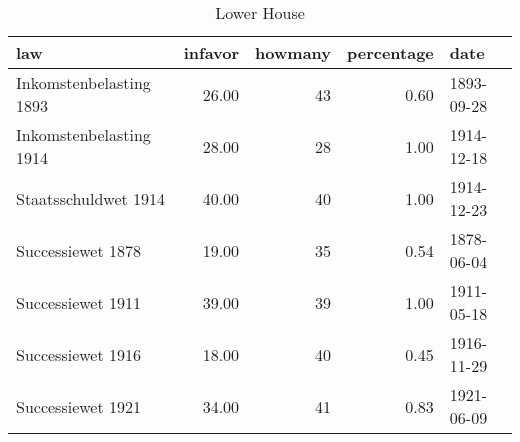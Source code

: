 \begin{table}[ht]
\centering
\begin{tabular}{lrrrl}
  \hline
law & infavor & howmany & percentage & date \\ 
  \hline
Inkomstenbelasting 1893 & 26.00 &  43 & 0.60 & 1893-09-28 \\ 
  Inkomstenbelasting 1914 & 28.00 &  28 & 1.00 & 1914-12-18 \\ 
  Staatsschuldwet 1914 & 40.00 &  40 & 1.00 & 1914-12-23 \\ 
  Successiewet 1878 & 19.00 &  35 & 0.54 & 1878-06-04 \\ 
  Successiewet 1911 & 39.00 &  39 & 1.00 & 1911-05-18 \\ 
  Successiewet 1916 & 18.00 &  40 & 0.45 & 1916-11-29 \\ 
  Successiewet 1921 & 34.00 &  41 & 0.83 & 1921-06-09 \\ 
   \hline
\end{tabular}
\caption{Lower House} 
\end{table}
